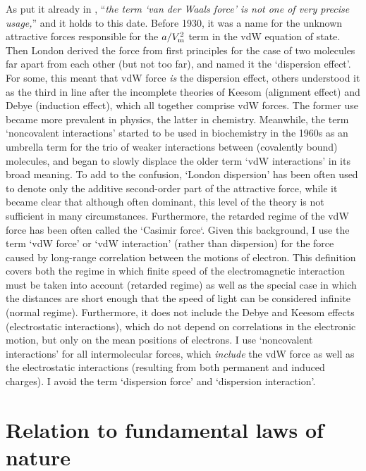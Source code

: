 As \citeauthor{MargenauRMP39} put it already in \citeyear{MargenauRMP39}, ``\emph{the term `van der Waals force' is not one of very precise usage,}'' and it holds to this date.
Before 1930, it was a name for the unknown attractive forces responsible for the $a/V_\text m^2$ term in the vdW equation of state.
Then London derived the force from first principles for the case of two molecules far apart from each other (but not too far), and named it the `dispersion effect'.
For some, this meant that vdW force \emph{is} the dispersion effect, others understood it as the third in line after the incomplete theories of Keesom (alignment effect) and Debye (induction effect), which all together comprise vdW forces.
The former use became more prevalent in physics, the latter in chemistry.
Meanwhile, the term `noncovalent interactions' started to be used in biochemistry in the 1960s as an umbrella term for the trio of weaker interactions between (covalently bound) molecules, and began to slowly displace the older term `vdW interactions' in its broad meaning.
To add to the confusion, `London dispersion' has been often used to denote only the additive second-order part of the attractive force, while it became clear that although often dominant, this level of the theory is not sufficient in many circumstances.
Furthermore, the retarded regime of the vdW force has been often called the `Casimir force`.
Given this background, I use the term `vdW force' or `vdW interaction' (rather than dispersion) for the force caused by long-range correlation between the motions of electron.
This definition covers both the regime in which finite speed of the electromagnetic interaction must be taken into account (retarded regime) as well as the special case in which the distances are short enough that the speed of light can be considered infinite (normal regime).
Furthermore, it does not include the Debye and Keesom effects (electrostatic interactions), which do not depend on correlations in the electronic motion, but only on the mean positions of electrons.
I use `noncovalent interactions' for all intermolecular forces, which \emph{include} the vdW force as well as the electrostatic interactions (resulting from both permanent and induced charges).
I avoid the term `dispersion force' and `dispersion interaction'.

\section{Relation to fundamental laws of nature}

